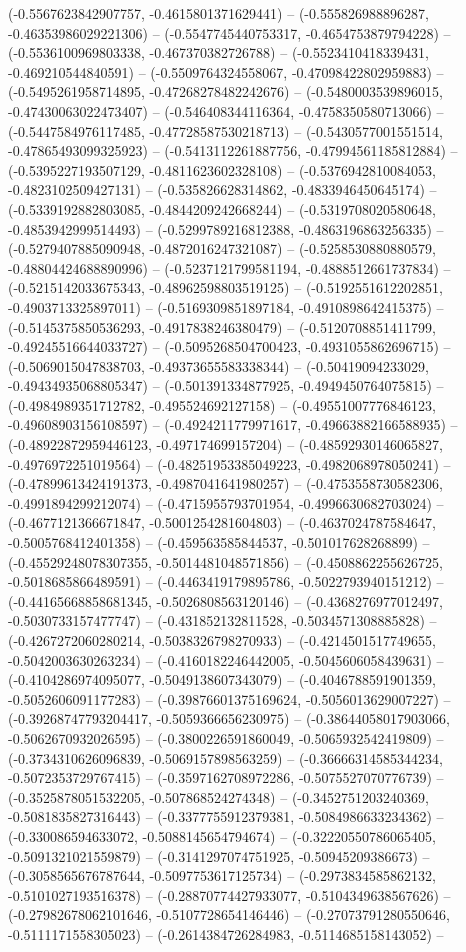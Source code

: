 (-0.5567623842907757, -0.4615801371629441) -- (-0.555826988896287, -0.46353986029221306) -- (-0.5547745440753317, -0.4654753879794228) -- (-0.5536100969803338, -0.467370382726788) -- (-0.5523410418339431, -0.469210544840591) -- (-0.5509764324558067, -0.47098422802959883) -- (-0.5495261958714895, -0.47268278482242676) -- (-0.5480003539896015, -0.47430063022473407) -- (-0.546408344116364, -0.4758350580713066) -- (-0.5447584976117485, -0.47728587530218713) -- (-0.5430577001551514, -0.47865493099325923) -- (-0.5413112261887756, -0.47994561185812884) -- (-0.5395227193507129, -0.4811623602328108) -- (-0.5376942810084053, -0.4823102509427131) -- (-0.535826628314862, -0.4833946450645174) -- (-0.5339192882803085, -0.4844209242668244) -- (-0.5319708020580648, -0.4853942999514493) -- (-0.5299789216812388, -0.4863196863256335) -- (-0.5279407885090948, -0.4872016247321087) -- (-0.5258530880880579, -0.48804424688890996) -- (-0.5237121799581194, -0.4888512661737834) -- (-0.5215142033675343, -0.48962598803519125) -- (-0.5192551612202851, -0.4903713325897011) -- (-0.5169309851897184, -0.4910898642415375) -- (-0.5145375850536293, -0.4917838246380479) -- (-0.5120708851411799, -0.49245516644033727) -- (-0.5095268504700423, -0.4931055862696715) -- (-0.5069015047838703, -0.49373655583338344) -- (-0.50419094233029, -0.49434935068805347) -- (-0.501391334877925, -0.4949450764075815) -- (-0.4984989351712782, -0.495524692127158) -- (-0.49551007776846123, -0.49608903156108597) -- (-0.4924211779971617, -0.49663882166588935) -- (-0.48922872959446123, -0.497174699157204) -- (-0.48592930146065827, -0.4976972251019564) -- (-0.48251953385049223, -0.4982068978050241) -- (-0.47899613424191373, -0.4987041641980257) -- (-0.4753558730582306, -0.4991894299212074) -- (-0.4715955793701954, -0.4996630682703024) -- (-0.4677121366671847, -0.5001254281604803) -- (-0.4637024787584647, -0.5005768412401358) -- (-0.459563585844537, -0.501017628268899) -- (-0.45529248078307355, -0.5014481048571856) -- (-0.4508862255626725, -0.5018685866489591) -- (-0.4463419179895786, -0.5022793940151212) -- (-0.44165668858681345, -0.5026808563120146) -- (-0.4368276977012497, -0.5030733157477747) -- (-0.431852132811528, -0.5034571308885828) -- (-0.4267272060280214, -0.5038326798270933) -- (-0.4214501517749655, -0.5042003630263234) -- (-0.4160182246442005, -0.5045606058439631) -- (-0.4104286974095077, -0.5049138607343079) -- (-0.4046788591901359, -0.5052606091177283) -- (-0.39876601375169624, -0.5056013629007227) -- (-0.39268747793204417, -0.5059366656230975) -- (-0.38644058017903066, -0.5062670932026595) -- (-0.3800226591860049, -0.5065932542419809) -- (-0.3734310626096839, -0.5069157898563259) -- (-0.36666314585344234, -0.5072353729767415) -- (-0.3597162708972286, -0.5075527070776739) -- (-0.3525878051532205, -0.507868524274348) -- (-0.3452751203240369, -0.5081835827316443) -- (-0.3377755912379381, -0.5084986633234362) -- (-0.330086594633072, -0.5088145654794674) -- (-0.32220550786065405, -0.5091321021559879) -- (-0.3141297074751925, -0.50945209386673) -- (-0.3058565676787644, -0.5097753617125734) -- (-0.2973834585862132, -0.5101027193516378) -- (-0.28870774427933077, -0.5104349638567626) -- (-0.27982678062101646, -0.5107728654146446) -- (-0.27073791280550646, -0.5111171558305023) -- (-0.2614384726284983, -0.5114685158143052) -- 